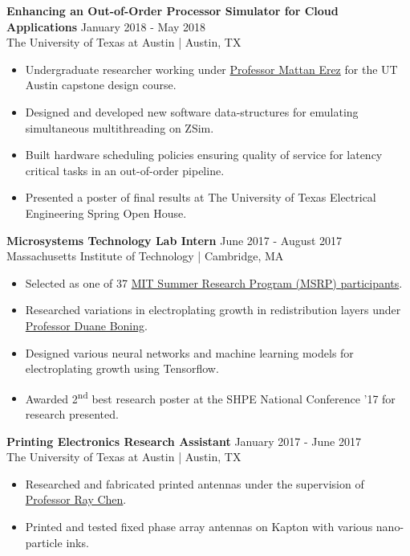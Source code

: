 \documentclass[line]{res}
\begin{document}
\begin{resume}
\textbf{Enhancing an Out-of-Order Processor Simulator for Cloud Applications} \hfill January 2018 - May 2018
\\
The University of Texas at Austin | Austin, TX
\\
\vspace{-3mm}
\begin{itemize}
\item Undergraduate researcher working under \href{https://www.ece.utexas.edu/people/faculty/mattan-erez}{Professor Mattan Erez} for the UT Austin capstone design course.
\item Designed and developed new software data-structures for emulating simultaneous multithreading on ZSim.
\item Built hardware scheduling policies ensuring quality of service for latency critical tasks in an out-of-order pipeline.
\item Presented a poster of final results at The University of Texas Electrical Engineering Spring Open House.
\end{itemize}

\textbf{Microsystems Technology Lab Intern} \hfill June 2017 - August 2017
\\
Massachusetts Institute of Technology | Cambridge, MA
\\
\vspace{-3mm}
\begin{itemize}
\item Selected as one of 37 \href{https://oge.mit.edu/msrp/}{MIT Summer Research Program (MSRP) participants}.
\item Researched variations in electroplating growth in redistribution layers under \href{https://boning.mit.edu/}{Professor Duane Boning}.
\item Designed various neural networks and machine learning models for electroplating growth using Tensorflow.
\item Awarded 2\textsuperscript{nd} best research poster at the SHPE National Conference '17 for research presented.
\end{itemize}

\textbf{Printing Electronics Research Assistant} \hfill January 2017 - June 2017
\\
The University of Texas at Austin | Austin, TX
\\
\vspace{-3mm}
\begin{itemize}
\item Researched and fabricated printed antennas under the supervision of \href{https://www.ece.utexas.edu/people/faculty/ray-chen}{Professor Ray Chen}.
\item Printed and tested fixed phase array antennas on Kapton with various nano-particle inks.
\end{itemize}


\end{resume}
\end{document}
